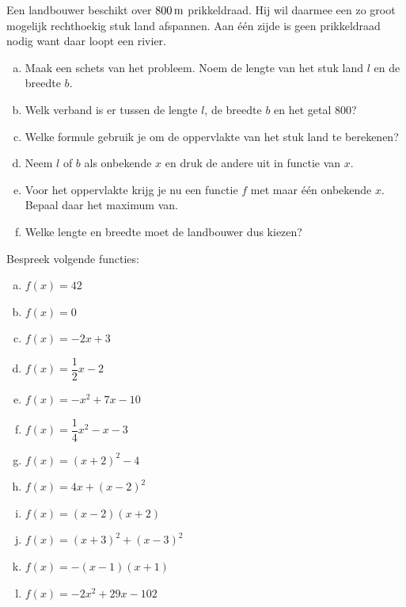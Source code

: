 \documentclass[12pt,twoside,a4paper]{article}
\begin{document}
\begin{oefening}
Een landbouwer beschikt over $800 \m$ prikkeldraad. Hij wil daarmee een zo groot mogelijk rechthoekig stuk land afspannen. Aan één zijde is geen prikkeldraad nodig want daar loopt een rivier.
\begin{enumerate}[(a)]
  \item Maak een schets van het probleem. Noem de lengte van het stuk land $l$ en de breedte $b$.
  \item Welk verband is er tussen de lengte $l$, de breedte $b$ en het getal $800$?
  \item Welke formule gebruik je om de oppervlakte van het stuk land te berekenen?
  \item Neem $l$ of $b$ als onbekende $x$ en druk de andere uit in functie van $x$.
  \item Voor het oppervlakte krijg je nu een functie $f$ met maar één onbekende $x$. Bepaal daar het maximum van.
  \item Welke lengte en breedte moet de landbouwer dus kiezen?
\end{enumerate}
\end{oefening}

\begin{oefening}
Bespreek volgende functies:
\begin{multicols}{2}
\begin{enumerate}[(a)]
  \itemsep.8em
  \item $\displaystyle f(x)=42$
  \item $\displaystyle f(x)=0$
  \item $\displaystyle f(x)=-2x+3$
  \item $\displaystyle f(x)=\dfrac{1}{2}x-2$
  \item $\displaystyle f(x)=-x^2+7x-10$
  \item $\displaystyle f(x)=\dfrac{1}{4}x^2-x-3$
  \item $f(x)=(x+2)^2-4$
  \item $f(x)=4x+(x-2)^2$
  \item $f(x)=(x-2)(x+2)$
  \item $f(x)=(x+3)^2+(x-3)^2$
  \item $f(x)=-(x-1)(x+1)$
  \item $f(x)=-2x^2+29x-102$
\end{enumerate}
\end{multicols}
\end{oefening}
\end{document}
